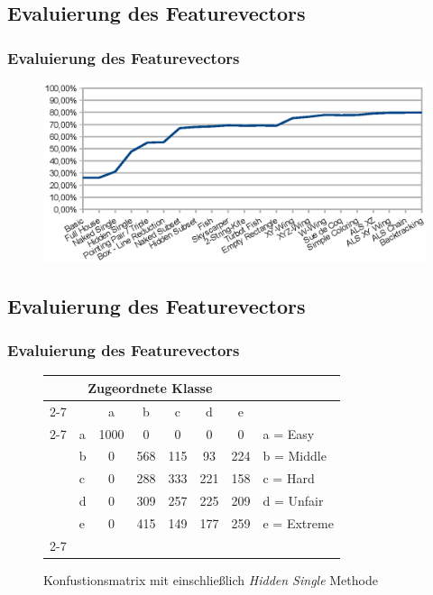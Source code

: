 \documentclass[accentcolor=tud6b,colorbacktitle,inverttitle,landscape,german,presentation,t]{tudbeamer}
\begin{document}
	\subsection{Evaluierung des Featurevectors}
		\begin{frame}
		\frametitle{Evaluierung des Featurevectors}
		\begin{figure}[Hh]
		\includegraphics[width=\textwidth,height=\textheight,keepaspectratio]{./img/accuracy.eps}
		\end{figure}
		\end{frame}

	\subsection{Evaluierung des Featurevectors}
		\begin{frame}
		\frametitle{Evaluierung des Featurevectors}
		\begin{figure}[Hh]
		\centering
		\begin{tabular}{ l | l |  c  c  c  c  c | l}
		\multicolumn{7}{c}{\textbf{Zugeordnete Klasse}}\\
		\cline{2-7}
		\multirow{6}{*}{\begin{turn}{90}\textbf{Klasse}\end{turn}}
		 &  & a & b & c & d & e\\
		\cline{2-7}
		& a & 1000 & 0 & 0 & 0 & 0 & a = Easy \\
		& b & 0 & 568 & 115 & 93 & 224 & b = Middle \\
		& c & 0 & 288 & 333 & 221 & 158 & c = Hard \\
		& d & 0 & 309 & 257 & 225 & 209 & d = Unfair \\
		& e & 0 & 415 & 149 & 177 & 259 & e = Extreme \\
		\cline{2-7}
		\end{tabular}
		\caption{Konfustionsmatrix mit einschließlich \textit{Hidden Single} Methode}
		\end{figure}
		\end{frame}
\end{document}
